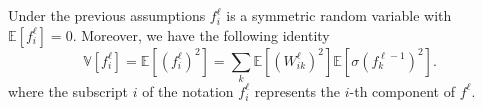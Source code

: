 \begin{lemma}\label{lemm:init}
Under the previous assumptions $f^\ell_i$  is a symmetric random variable with $\mathbb{E}[f^\ell_i] = 0$.
Moreover, we have the following identity
\begin{equation}\label{eq:FWini}
\mathbb{V}[f^{\ell}_i] = \mathbb{E}[(f^{\ell}_i)^2] = \sum_{k}\mathbb{E}[(W^\ell_{ik})^2]\mathbb{E}[\sigma(f^{\ell-1}_k)^2].
\end{equation}
where the subscript $i$ of the notation $f_i^\ell$ represents the $i$-th component of $f^\ell$.
\end{lemma}
